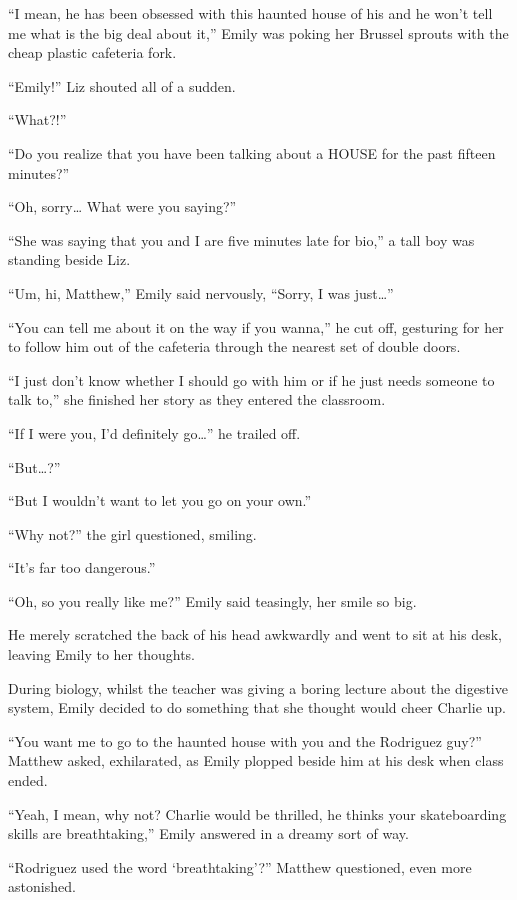 “I mean, he has been obsessed with this haunted house of his and he won’t tell me what is the big deal about it,”
Emily was poking her Brussel sprouts with the cheap plastic cafeteria fork.

“Emily!” Liz shouted all of a sudden.

“What?!”

“Do you realize that you have been talking about a HOUSE for the past fifteen minutes?”

“Oh, sorry… What were you saying?”

“She was saying that you and I are five minutes late for bio,” a tall boy was standing beside Liz.

“Um, hi, Matthew,” Emily said nervously, “Sorry, I was just…”

“You can tell me about it on the way if you wanna,” he cut off, gesturing for her to follow him out of the cafeteria through the nearest set of double doors.

\bigskip

“I just don’t know whether I should go with him or if he just needs someone to talk to,” she finished her story as they entered the classroom.

“If I were you, I’d definitely go…” he trailed off.

“But…?”

“But I wouldn’t want to let you go on your own.”

“Why not?” the girl questioned, smiling.

“It’s far too dangerous.”

“Oh, so you really like me?” Emily said teasingly, her smile so big.

He merely scratched the back of his head awkwardly and went to sit at his desk, leaving Emily to her thoughts.

During biology, whilst the teacher was giving a boring lecture about the digestive system, Emily decided to do something that she thought would cheer Charlie up.

\bigskip

“You want me to go to the haunted house with you and the Rodriguez guy?” Matthew asked, exhilarated, as Emily plopped beside him at his desk when class ended.

“Yeah, I mean, why not? Charlie would be thrilled, he thinks your skateboarding skills are breathtaking,” Emily answered in a dreamy sort of way.

“Rodriguez used the word ‘breathtaking’?” Matthew questioned, even more astonished.

